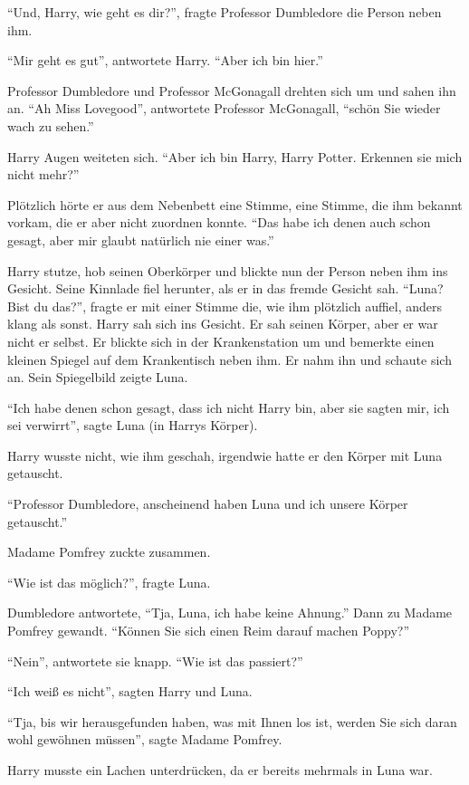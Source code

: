 \enquote{Und, Harry, wie geht es dir?}, fragte Professor Dumbledore die Person neben ihm.

\enquote{Mir geht es gut}, antwortete Harry. \enquote{Aber ich bin hier.}

Professor Dumbledore und Professor McGonagall drehten sich um und sahen ihn an. \enquote{Ah Miss Lovegood}, antwortete Professor McGonagall, \enquote{schön Sie wieder wach zu sehen.}

Harry Augen weiteten sich. \enquote{Aber ich bin Harry, Harry Potter. Erkennen sie mich nicht mehr?}

Plötzlich hörte er aus dem Nebenbett eine Stimme, eine Stimme, die ihm bekannt vorkam, die er aber nicht zuordnen konnte. \enquote{Das habe ich denen auch schon gesagt, aber mir glaubt natürlich nie einer was.}

Harry stutze, hob seinen Oberkörper und blickte nun der Person neben ihm ins Gesicht. Seine Kinnlade fiel herunter, als er in das fremde Gesicht sah. \enquote{Luna? Bist du das?}, fragte er mit einer Stimme die, wie ihm plötzlich auffiel, anders klang als sonst. Harry sah sich ins Gesicht. Er sah seinen Körper, aber er war nicht er selbst. Er blickte sich in der Krankenstation um und bemerkte einen kleinen Spiegel auf dem Krankentisch neben ihm. Er nahm ihn und schaute sich an. Sein Spiegelbild zeigte Luna.

\enquote{Ich habe denen schon gesagt, dass ich nicht Harry bin, aber sie sagten mir, ich sei verwirrt}, sagte Luna (in Harrys Körper).

Harry wusste nicht, wie ihm geschah, irgendwie hatte er den Körper mit Luna getauscht.

\enquote{Professor Dumbledore, anscheinend haben Luna und ich unsere Körper getauscht.}

Madame Pomfrey zuckte zusammen.

\enquote{Wie ist das möglich?}, fragte Luna.

Dumbledore antwortete, \enquote{Tja, Luna, ich habe keine Ahnung.} Dann zu Madame Pomfrey gewandt. \enquote{Können Sie sich einen Reim darauf machen Poppy?}

\enquote{Nein}, antwortete sie knapp. \enquote{Wie ist das passiert?}

\enquote{Ich weiß es nicht}, sagten Harry und Luna.

\enquote{Tja, bis wir herausgefunden haben, was mit Ihnen los ist, werden Sie sich daran wohl gewöhnen müssen}, sagte Madame Pomfrey.

Harry musste ein Lachen unterdrücken, da er bereits mehrmals in Luna war.

